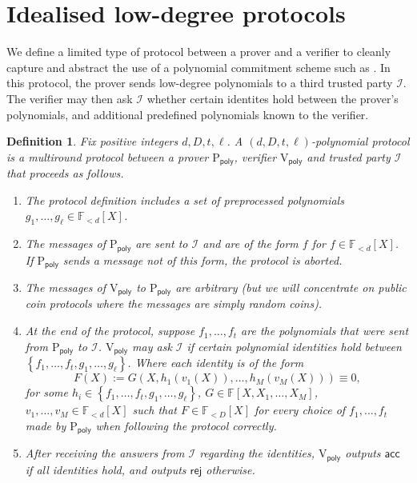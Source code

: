 \documentclass[11pt]{article} %
\newcommand{\F}{\ensuremath{\mathbb F}\xspace}
\newcommand{\rej}{\ensuremath{\mathsf{rej}}\xspace}
\newcommand{\acc}{\ensuremath{\mathsf{acc}}\xspace}
\newcommand{\defeq}{:=}
\newcommand{\prvpoly}{\ensuremath{\mathrm{P_{\mathsf{poly}}}}\xspace}
\newcommand{\verpoly}{\ensuremath{\mathrm{V_{\mathsf{poly}}}}\xspace}
\newcommand{\ideal}{\ensuremath{\mathcal{I}}\xspace}
\newcommand{\set}[1]{\ensuremath{\left\{#1\right\}}\xspace}
\newcommand{\polysofdeg}[1]{\ensuremath{\F_{< #1}[X]}\xspace}
\newtheorem{dfn}[lemma]{Definition}
\begin{document}
\section{Idealised low-degree protocols}\label{sec:polyprot}
We define a limited type of protocol between a prover and a verifier to cleanly capture and abstract the use of a polynomial commitment scheme such as \cite{kate}.
 In this protocol, the prover sends low-degree polynomials to a third trusted party \ideal.
The verifier may then ask \ideal whether certain identites hold between the prover's polynomials, and additional predefined polynomials known to the verifier.
\begin{dfn}\label{dfn:polyprotocol}
Fix positive integers $d,D,t,\ell$.
A \emph{$(d,D,t,\ell)$-polynomial protocol} is a multiround protocol between a prover \prvpoly, verifier 
\verpoly and trusted party \ideal that proceeds as follows.

\begin{enumerate}
\item The protocol definition includes a set of \emph{preprocessed polynomials} $g_1,\ldots,g_\ell \in \polysofdeg{d}$.

\item The messages of \prvpoly are sent to \ideal and are of the form $f$ for $f\in \polysofdeg{d}$. If \prvpoly sends a message not of this form, the protocol is aborted.
 
 
\item The messages of  \verpoly to \prvpoly are arbitrary (but we will concentrate on public coin protocols where the messages are simply random coins).


 \item At the end of the protocol, suppose $f_1,\ldots,f_t$ are the polynomials that were sent from \prvpoly to \ideal. \verpoly may ask \ideal if certain polynomial identities hold between \set{f_1,\ldots,f_t,g_1,\ldots,g_\ell}.
 Where each identity is of the form
 \[F(X)\defeq G(X, h_1(v_1(X)),\ldots,h_M(v_M(X)))\equiv 0,\]
 for some $h_i\in  \set{f_1,\ldots,f_t,g_1,\ldots,g_\ell}$, $G\in \F[X,X_1,\ldots,X_{M}]$, $v_1,\ldots,v_{M} \in \polysofdeg{d}$
 such that $F\in \polysofdeg{D}$ for every choice of $f_1,\ldots,f_t$ made by \prvpoly when following the protocol correctly.
 
 
 
 \item After receiving the answers from \ideal regarding the identities, \verpoly outputs \acc if all identities hold, and outputs \rej otherwise.

\end{enumerate}
 
\end{dfn}
\end{document}
